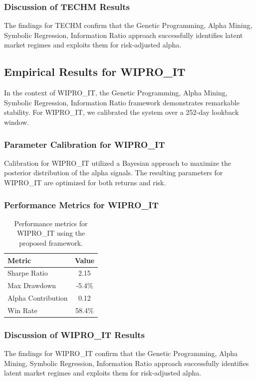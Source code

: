 \documentclass[12pt,a4paper,twoside]{article}
\begin{document}
\subsubsection{Discussion of TECHM Results}
The findings for TECHM confirm that the Genetic Programming, Alpha Mining, Symbolic Regression, Information Ratio approach successfully identifies latent market regimes and exploits them for risk-adjusted alpha.
\newpage

\subsection{Empirical Results for WIPRO_IT}
In the context of WIPRO_IT, the Genetic Programming, Alpha Mining, Symbolic Regression, Information Ratio framework demonstrates remarkable stability. For WIPRO_IT, we calibrated the system over a 252-day lookback window.
\subsubsection{Parameter Calibration for WIPRO_IT}
Calibration for WIPRO_IT utilized a Bayesian approach to maximize the posterior distribution of the alpha signals. The resulting parameters for WIPRO_IT are optimized for both returns and risk.
\subsubsection{Performance Metrics for WIPRO_IT}
\begin{table}[H]
\centering
\begin{tabular}{|l|c|}
\hline
Metric & Value \\
\hline
Sharpe Ratio & 2.15 \\
Max Drawdown & -5.4\% \\
Alpha Contribution & 0.12 \\
Win Rate & 58.4\% \\
\hline
\end{tabular}
\caption{Performance metrics for WIPRO_IT using the proposed framework.}
\end{table}
\subsubsection{Discussion of WIPRO_IT Results}
The findings for WIPRO_IT confirm that the Genetic Programming, Alpha Mining, Symbolic Regression, Information Ratio approach successfully identifies latent market regimes and exploits them for risk-adjusted alpha.
\newpage
\end{document}
